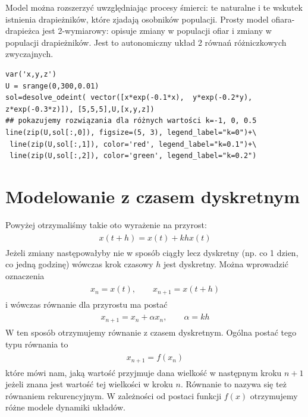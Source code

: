 \documentclass[a4paper,12pt,polish]{sphinxmanual}
\begin{document}
Model można rozszerzyć uwzględniając procesy śmierci: te naturalne i te wskutek istnienia drapieżników, które zjadają  osobników populacji. Prosty model  ofiara-drapieżca  jest 2-wymiarowy: opisuje zmiany w populacji ofiar i zmiany w populacji drapieżników. Jest to autonomiczny układ 2 równań różniczkowych zwyczajnych.


\begin{verbatim}
var('x,y,z')
U = srange(0,300,0.01)
sol=desolve_odeint( vector([x*exp(-0.1*x),  y*exp(-0.2*y),  z*exp(-0.3*z)]), [5,5,5],U,[x,y,z])
## pokazujemy rozwiązania dla różnych wartości k=-1, 0, 0.5
line(zip(U,sol[:,0]), figsize=(5, 3), legend_label="k=0")+\
 line(zip(U,sol[:,1]), color='red', legend_label="k=0.1")+\
 line(zip(U,sol[:,2]), color='green', legend_label="k=0.2")
\end{verbatim}



\section{Modelowanie z czasem dyskretnym}
\label{ch1/chI011:modelowanie-z-czasem-dyskretnym}
Powyżej otrzymaliśmy takie oto wyrażenie na przyrost:
\phantomsection\label{ch1/chI011:equation-eqn28}\begin{gather}
\begin{split}x(t+h) = x(t) + k h x(t)\end{split}\label{ch1/chI011-eqn28}
\end{gather}
Jeżeli zmiany następowałyby nie w sposób ciągły  lecz dyskretny (np.  co 1 dzien, co jedną godzinę) wówczas  krok czasowy $h$ jest dyskretny. Można wprowadzić oznaczenia
\label{ch1/chI011:equation-eqn29}\begin{gather}
\begin{split}x_n = x(t), \quad \quad x_{n+1} = x(t+h)\end{split}\label{ch1/chI011-eqn29}
\end{gather}
i wówczas równanie dla przyrostu ma postać
\label{ch1/chI011:equation-eqn30}\begin{gather}
\begin{split}x_{n+1} = x_n + \alpha x_n, \quad \quad \alpha = k h\end{split}\label{ch1/chI011-eqn30}
\end{gather}
W ten sposób otrzymujemy równanie z czasem dyskretnym. Ogólna postać tego typu równania to
\label{ch1/chI011:equation-eqn31}\begin{gather}
\begin{split}x_{n+1} = f(x_n)\end{split}\label{ch1/chI011-eqn31}
\end{gather}
które mówi nam, jaką wartość przyjmuje dana wielkość w następnym kroku $n+1$ jeżeli znana jest wartość tej wielkości w kroku $n$. Równanie to nazywa się też równaniem rekurencyjnym. W zależności od postaci funkcji $f(x)$ otrzymujemy różne modele dynamiki układów.
\end{document}
